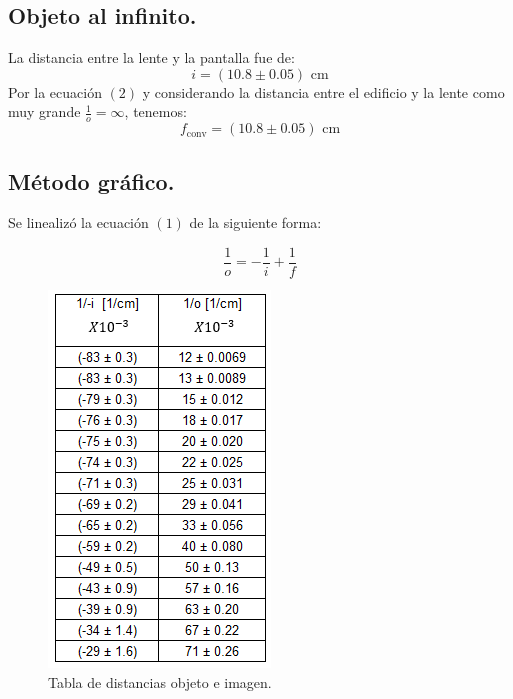 \documentclass[DIV=calc, paper=a4, fontsize=10pt]{scrartcl}
\begin{document}
\subsection*{\textcolor{carmine}{Objeto al infinito.}}
La distancia entre la lente y la pantalla fue de:
\begin{equation*}
    i= (10.8 \pm 0.05) \text{ cm}
\end{equation*}
Por la ecuación $(2)$ y considerando la distancia entre el edificio y la lente como muy grande $\frac{1}{o}=\infty$, tenemos:
\begin{equation*}
    f_{\text{conv}}= (10.8 \pm 0.05) \text{ cm}
\end{equation*}



\subsection*{\textcolor{carmine}{Método gráfico.}}

Se linealizó la ecuación $(1)$ de la siguiente forma:

\begin{equation*}
    \frac{1}{o} =- \frac{1}{i} + \frac{1}{f}
\end{equation*}
\begin{figure}[H]
    \centering
    \includegraphics[scale=0.8]{tablas/tabla grafico.PNG}
    \caption{Tabla de distancias objeto e imagen.}
\end{figure}
\end{document}
